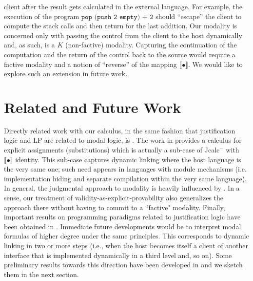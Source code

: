 \begin{itemize}
            client after the result gets calculated 
            in the external language. For example, the execution of the  program ${\texttt{pop (push 2 empty) + 2}}$ should ``escape'' the client 
            to compute the stack calls and then return
            for the last addition. Our modality is concerned  only with passing the control from the client to the host dynamically and, as such, is a $K$ 
            (non-factive) modality. Capturing the continuation of the computation and the return of the control back 
            to the source would  require a factive modality and a notion of ``reverse'' of the mapping $\llbracket\bullet\rrbracket$. 
            We would like to explore  such an extension in  future work.
        \end{itemize}
        
        
        
        
        \section{Related and Future Work}
        \label{relat}
        Directly related work with our calculus, in the same fashion that justification logic and LP \cite{Artemov2001} are related to modal logic, is \cite{Bellin2001}.  The work in \cite{Bellin2001} provides a calculus for explicit assignments (substitutions) which is actually a sub-case of 
        {\sf Jcalc$^{-}$} with $\llbracket\bullet \rrbracket$ identity. This  sub-case  captures dynamic linking where the host language is the very same one; such need appears in languages with module mechanisms (i.e. implementation hiding and separate compilation within the very same language). In general, the judgmental approach to modality is heavily influenced by \cite{citeulike:5447115}. In a sense, our treatment of validity-as-explicit-provability also generalizes the approach there without having to commit to a ``factive" modality. Finally,  
        important results on programming paradigms related to justification logic have been obtained in \cite{ArtBon07LFCS,BONELLI2012935, bavera2010justification}. 
        Immediate future developments would be to interpret modal formulas of higher degree under the same principles. 
        This corresponds to dynamic linking in two or more steps (i.e., when the host becomes itself a client of another interface that is implemented dynamically in a third level and, so on). 
        Some preliminary results towards this 
        direction have been developed in \cite{DBLP:journals/entcs/PouliasisP14} and we sketch them in the next section. 
        

